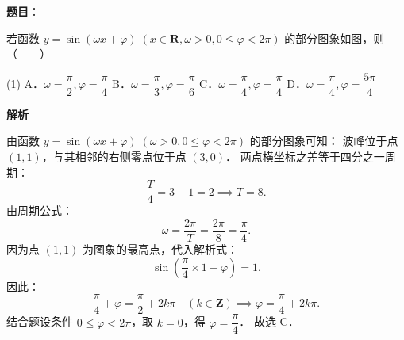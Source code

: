 \begin{answer}

\textbf{题目}：

若函数 $y = \sin(\omega x + \varphi) \; (x \in \mathbf{R}, \omega > 0, 0 \leqslant \varphi < 2\pi)$ 的部分图象如图，则\mbox{（　　）}
\nopagebreak[4]
\begin{center}\end{center}
\nopagebreak[4]
\begin{gkopts}(1)
\task A．$\omega = \dfrac{\pi}{2}, \varphi = \dfrac{\pi}{4}$
\task B．$\omega = \dfrac{\pi}{3}, \varphi = \dfrac{\pi}{6}$
\task C．$\omega = \dfrac{\pi}{4}, \varphi = \dfrac{\pi}{4}$
\task D．$\omega = \dfrac{\pi}{4}, \varphi = \dfrac{5\pi}{4}$
\end{gkopts}

\textbf{解析}

由函数 $y = \sin(\omega x + \varphi) \; (\omega > 0, 0 \leqslant \varphi < 2\pi)$ 的部分图象可知：
波峰位于点 $(1, 1)$，与其相邻的右侧零点位于点 $(3, 0)$．
两点横坐标之差等于四分之一周期：
\nopagebreak[4]
\[
\frac{T}{4} = 3 - 1 = 2 \implies T = 8.
\]
由周期公式：
\nopagebreak[4]
\[
\omega = \frac{2\pi}{T} = \frac{2\pi}{8} = \frac{\pi}{4}.
\]
因为点 $(1, 1)$ 为图象的最高点，代入解析式：
\nopagebreak[4]
\[
\sin\left(\frac{\pi}{4} \times 1 + \varphi\right) = 1.
\]
因此：
\nopagebreak[4]
\[
\frac{\pi}{4} + \varphi = \frac{\pi}{2} + 2k\pi \quad (k \in \mathbf{Z}) \implies \varphi = \frac{\pi}{4} + 2k\pi.
\]
结合题设条件 $0 \leqslant \varphi < 2\pi$，取 $k = 0$，得 $\varphi = \dfrac{\pi}{4}$．
故选 C．


\end{answer}
